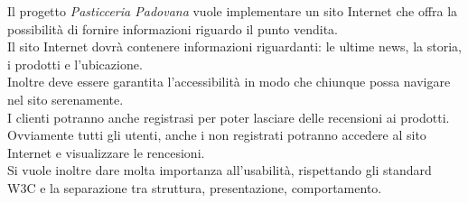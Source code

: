Il progetto \emph{Pasticceria Padovana} vuole implementare un sito Internet che offra la possibilità di fornire informazioni riguardo il punto vendita.\\
Il sito Internet dovrà contenere informazioni riguardanti: le ultime news, la storia, i prodotti e l'ubicazione. \\Inoltre deve essere garantita l'accessibilità in modo che chiunque possa navigare nel sito serenamente.\\
I clienti potranno anche registrasi per poter lasciare delle recensioni ai prodotti. Ovviamente tutti gli utenti, anche i non registrati potranno accedere al sito Internet e visualizzare le rencesioni.\\
Si vuole inoltre dare molta importanza all'usabilità, rispettando gli standard W3C e la separazione tra struttura, presentazione, comportamento.
